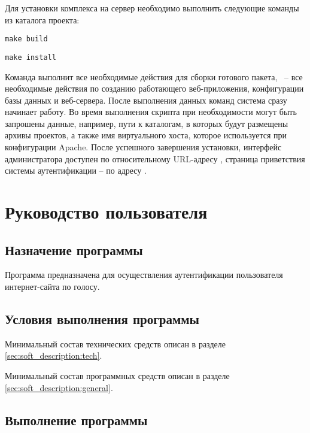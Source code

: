 Для установки комплекса на сервер необходимо выполнить следующие команды из каталога проекта:

\begin{lscommand}\verb+make build+\end{lscommand}
\begin{lscommand}\verb+make install+\end{lscommand}

\noindent Команда  выполнит все необходимые действия для сборки готового пакета, ~-- все необходимые действия по созданию работающего веб-приложения, конфигурации базы данных и веб-сервера. После выполнения данных команд система сразу начинает работу. Во время выполнения скрипта при необходимости могут быть запрошены данные, например, пути к каталогам, в которых будут размещены архивы проектов, а также имя виртуального хоста, которое используется при конфигурации Apache. После успешного завершения установки, интерфейс администратора доступен по относительному URL-адресу , страница приветствия системы аутентификации -- по адресу .

\section{Руководство пользователя}
\label{sec:man}

\subsection{Назначение программы}

Программа предназначена для осуществления аутентификации пользователя
интернет-сайта по голосу.

\subsection{Условия выполнения программы}

Минимальный состав технических средств описан в разделе \ref{sec:soft_description:tech}.

Минимальный состав программных средств описан в разделе \ref{sec:soft_description:general}.

\subsection{Выполнение программы}



